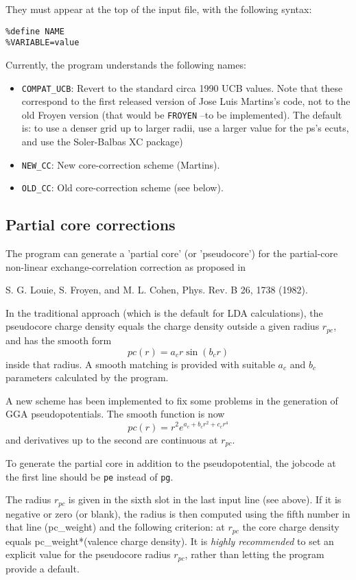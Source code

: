 \documentclass[11pt]{article}
\begin{document}
They must appear at the top of the input file, with the following
syntax:
\begin{verbatim}
%define NAME
%VARIABLE=value
\end{verbatim}
Currently, the program understands the following names:
\begin{itemize}
\item
{\tt COMPAT\_UCB}: Revert to the standard circa 1990 UCB values. Note   
that these correspond to the first released version 
of Jose Luis Martins's code, not to the old Froyen        
version (that would be {\tt FROYEN} --to be implemented).
The default is: to use a denser grid up to larger radii, 
use a larger value for the ps's ecuts, and use the Soler-Balbas XC package)  
                                                                          
\item
{\tt NEW\_CC}: New core-correction scheme (Martins).

\item
{\tt OLD\_CC}: Old core-correction scheme (see below).
\end{itemize}


\subsection{Partial core corrections}

The program can generate a 'partial core' (or 'pseudocore') 
for the partial-core non-linear exchange-correlation correction as
proposed in

\noindent
S. G. Louie, S. Froyen, and M. L. Cohen, Phys. Rev. B 26, 1738 (1982).

\noindent
In the traditional approach (which is the default for LDA
calculations), the pseudocore charge density equals the charge density
outside a given radius $r_{pc}$, and has the smooth form
$$
pc(r) = a_c r   \sin(b_c r)
$$
inside that radius. A smooth matching is provided with suitable $a_c$ 
and $b_c$ parameters calculated by the program.

A new scheme has been implemented to fix some problems in the generation
of GGA pseudopotentials. The smooth function is now
$$
pc(r) =  r^2  e^{a_c+b_c r^2+c_c r^4}
$$
and derivatives up to the second are continuous  at $r_{pc}$.

To generate the partial core in addition to the pseudopotential,
the jobcode at the first line should be {\tt pe} instead of {\tt pg}.

The radius $r_{pc}$ is given in the sixth slot in the last
input line (see above). If it is negative or zero (or blank), the
radius is then computed using the fifth number in that line (pc\_weight)
and the following criterion: at $r_{pc}$ the core charge density 
equals pc\_weight*(valence charge density).
It is {\it highly recommended} to set an explicit value for the pseudocore
radius $r_{pc}$, rather than letting the program provide a default.
\end{document}
